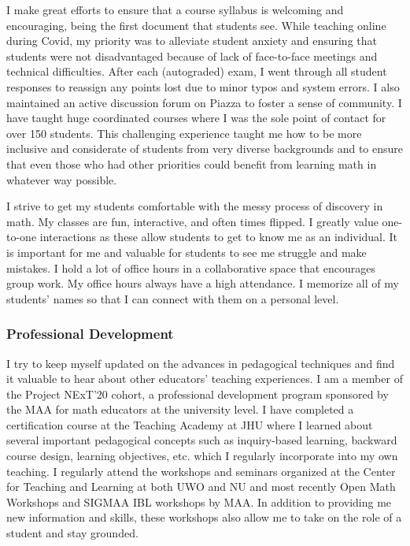 \documentclass[
]{report}
\begin{document}
I make great efforts to ensure that a course syllabus is welcoming and encouraging, being the first document that students see.
While teaching online during Covid, my priority was to alleviate student anxiety and ensuring that students were not disadvantaged because of lack of face-to-face meetings and technical difficulties.
After each (autograded) exam, I went through all student responses to reassign any points lost due to minor typos and system errors.
I also maintained an active discussion forum on Piazza to foster a sense of community.
I have taught huge coordinated courses where I was the sole point of contact for over 150 students.
This challenging experience taught me how to be more inclusive and considerate of students from very diverse backgrounds and to ensure that even those who had other priorities could benefit from learning math in whatever way possible.

I strive to get my students comfortable with the messy process of discovery in math.
My classes are fun, interactive, and often times flipped.
I greatly value one-to-one interactions as these allow students to get to know me as an individual.
It is important for me and valuable for students to see me struggle and make mistakes.
I hold a lot of office hours in a collaborative space that encourages group work.
My office hours always have a high attendance.
I memorize all of my students' names so that I can connect with them on a personal level.

\hypertarget{professional-development}{%
\subsubsection*{Professional Development}\label{professional-development}}


I try to keep myself updated on the advances in pedagogical techniques and find it valuable to hear about other educators' teaching experiences.
I am a member of the Project NExT'20 cohort, a professional development program sponsored by the MAA for math educators at the university level.
I have completed a certification course at the Teaching Academy at JHU where I learned about several important pedagogical concepts such as inquiry-based learning, backward course design, learning objectives, etc. which I regularly incorporate into my own teaching.
I regularly attend the workshops and seminars organized at the Center for Teaching and Learning at both UWO and NU and most recently Open Math Workshops and SIGMAA IBL workshops by MAA.
In addition to providing me new information and skills, these workshops also allow me to take on the role of a student and stay grounded.
\end{document}
